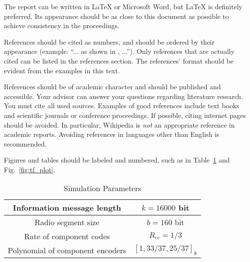 \documentclass[journal, a4paper]{IEEEtran}
\begin{document}
    The report can be written in \LaTeX{} or Microsoft Word, but \LaTeX{} is definitely preferred.
    Its appearance should be as close to this document as possible to achieve consistency in the proceedings.

    References should be cited as numbers, and should be ordered by their appearance (example: ``... as shown in \cite{HOP96}, ...'').
    Only references that are actually cited can be listed in the references section.
    The references' format should be evident from the examples in this text.

    References should be of academic character and should be published and accessible.
    Your advisor can answer your questions regarding literature research.
    You must cite all used sources.
    Examples of good references include text books and scientific journals or conference proceedings.
    If possible, citing internet pages should be avoided. In particular, Wikipedia is \emph{not} an appropriate reference in academic reports.
    Avoiding references in languages other than English is recommended.

    Figures and tables should be labeled and numbered, such as in Table~\ref{tab:simParameters} and Fig.~\ref{fig:tf_plot}.

    \begin{table}[!hbt]
        \begin{center}
        \caption{Simulation Parameters}
        \label{tab:simParameters}
        \begin{tabular}{|c|c|}
            \hline
            Information message length & $k=16000$ bit \\
            \hline
            Radio segment size & $b=160$ bit \\
            \hline
            Rate of component codes & $R_{cc}=1/3$\\
            \hline
            Polynomial of component encoders & $[1 , 33/37 , 25/37]_8$\\
            \hline
        \end{tabular}
        \end{center}
    \end{table}
\end{document}
